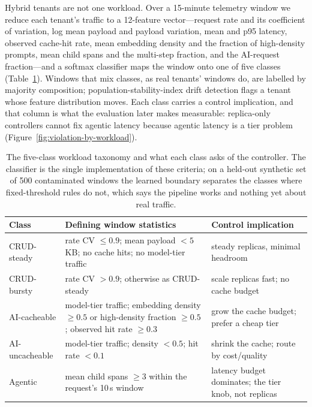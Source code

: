Hybrid tenants are not one workload. Over a 15-minute telemetry window we
reduce each tenant's traffic to a 12-feature vector---request rate and its
coefficient of variation, log mean payload and payload variation, mean and
p95 latency, observed cache-hit rate, mean embedding density and the
fraction of high-density prompts, mean child spans and the multi-step
fraction, and the AI-request fraction---and a softmax classifier maps the
window onto one of five classes (Table~\ref{tab:taxonomy}). Windows that
mix classes, as real tenants' windows do, are labelled by majority
composition; population-stability-index drift detection flags a tenant
whose feature distribution moves. Each class carries a control implication,
and that column is what the evaluation later makes measurable: replica-only
controllers cannot fix agentic latency because agentic latency is a tier
problem (Figure~\ref{fig:violation-by-workload}).

\begin{table}[htbp]
\centering\tablefont
\begin{tabularx}{\textwidth}{@{}l>{\raggedright\arraybackslash}p{}X@{}}
\toprule
\textbf{Class} & \textbf{Defining window statistics} & \textbf{Control implication} \\
\midrule
CRUD-steady & rate CV $\le 0.9$; mean payload $< 5$\,KB; no cache hits; no
model-tier traffic & steady replicas, minimal headroom \\
CRUD-bursty & rate CV $> 0.9$; otherwise as CRUD-steady & scale replicas
fast; no cache budget \\
AI-cacheable & model-tier traffic; embedding density $\ge 0.5$ or
high-density fraction $\ge 0.5$; observed hit rate $\ge 0.3$ & grow the
cache budget; prefer a cheap tier \\
AI-uncacheable & model-tier traffic; density $< 0.5$; hit rate $< 0.1$ &
shrink the cache; route by cost/quality \\
Agentic & mean child spans $\ge 3$ within the request's 10\,s window &
latency budget dominates; the tier knob, not replicas \\
\bottomrule
\end{tabularx}
\caption{The five-class workload taxonomy and what each class asks of the
controller. The classifier is the single implementation of these criteria;
on a held-out synthetic set of 500 contaminated windows the learned
boundary separates the classes where fixed-threshold rules do not, which
says the pipeline works and nothing yet about real traffic.}
\label{tab:taxonomy}
\end{table}

